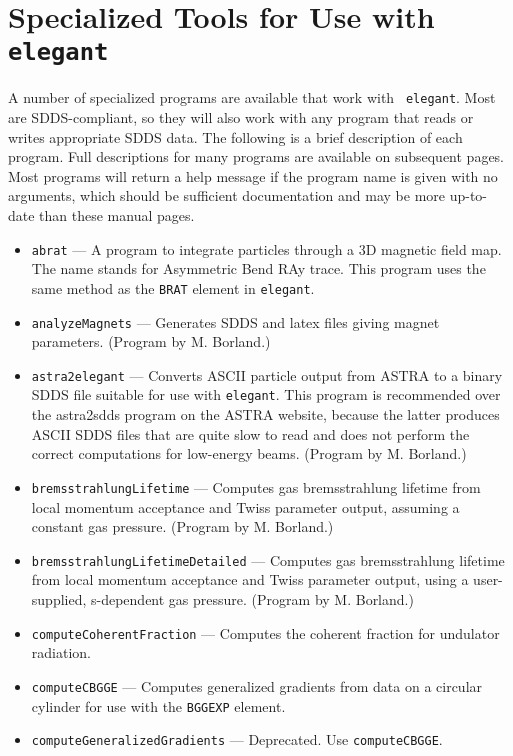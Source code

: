 \documentclass[11pt]{article}
\begin{document}
\newpage
\section{Specialized Tools for Use with {\tt elegant}}

A number of specialized programs are available that work with {\tt
elegant}. Most are SDDS-compliant, so they will also work with any
program that reads or writes appropriate SDDS data.  The following is
a brief description of each program.  Full descriptions for many programs are available
on subsequent pages.  Most programs will return a help message if the program name is
given with no arguments, which should be sufficient documentation and may be more
up-to-date than these manual pages.
\begin{itemize}
\item {\tt abrat} --- A program to integrate particles through a 3D magnetic field map. The name 
 stands for Asymmetric Bend RAy trace. This program uses the same method as the \verb|BRAT|
 element in {\tt elegant}.
\item {\tt analyzeMagnets} --- Generates SDDS and latex files giving magnet parameters.
  (Program by M. Borland.)
\item {\tt astra2elegant} --- Converts ASCII particle output from ASTRA \cite{ASTRA} to a binary
  SDDS file suitable for use with {\tt elegant}.  This program is recommended over
  the astra2sdds program on the ASTRA website, because the latter produces ASCII SDDS
  files that are quite slow to read and does not perform the correct computations
  for low-energy beams.
  (Program by M. Borland.)
\item {\tt bremsstrahlungLifetime} --- Computes gas bremsstrahlung lifetime from local momentum acceptance and Twiss parameter output,
  assuming a constant gas pressure.
  (Program by M. Borland.)
\item {\tt bremsstrahlungLifetimeDetailed} --- Computes gas bremsstrahlung lifetime from local momentum acceptance and Twiss 
  parameter output, using a user-supplied, s-dependent gas pressure.
  (Program by M. Borland.)
\item {\tt computeCoherentFraction} --- Computes the coherent fraction for undulator radiation.
\item {\tt computeCBGGE} --- Computes generalized gradients from data on a circular cylinder
  for use with the \verb|BGGEXP| element. 
\item {\tt computeGeneralizedGradients} --- Deprecated.  Use \verb|computeCBGGE|.

\end{itemize}
\end{document}
